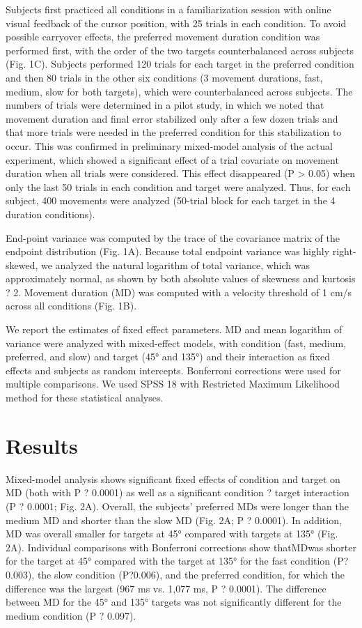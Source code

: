 Subjects first practiced all conditions in a familiarization session with online visual feedback of the cursor position, with 25 trials in each condition. 
To avoid possible carryover effects, the preferred movement duration condition was performed first, with the order of the two targets counterbalanced across subjects (Fig. 1C). 
Subjects performed 120 trials for each target in the preferred condition and then 80 trials in the other six conditions (3 movement durations, fast, medium, slow for both targets), which were counterbalanced across subjects. 
The numbers of trials were determined in a pilot study, in which we noted that movement duration and final error stabilized only after a few dozen trials and that more trials were needed in the preferred condition for this stabilization to occur. 
This was confirmed in preliminary mixed-model analysis of the actual experiment, which showed a significant effect of a trial covariate on movement duration when all trials were considered. This effect disappeared (P > 0.05) when only the last 50 trials in each condition and target were analyzed. Thus, for each subject, 400 movements were analyzed (50-trial block for each target in the 4 duration conditions).

End-point variance was computed by the trace of the covariance matrix of the endpoint distribution (Fig. 1A). Because total endpoint variance was highly right-skewed, we analyzed the natural logarithm of total variance, which was approximately normal, as shown by both absolute values of skewness and kurtosis ? 2. Movement duration (MD) was computed with a velocity threshold of 1 cm/s across all conditions (Fig. 1B).

We report the estimates of fixed effect parameters. MD and mean logarithm of variance were analyzed with mixed-effect models, with condition (fast, medium, preferred, and slow) and target (45° and 135°) and their interaction as fixed effects and subjects as random intercepts. Bonferroni corrections were used for multiple comparisons. We used SPSS 18 with Restricted Maximum Likelihood method for these statistical analyses.

\section{Results}

Mixed-model analysis shows significant fixed effects of condition and target on MD (both with P ? 0.0001) as well as a significant condition ? target interaction (P ? 0.0001; Fig. 2A). Overall, the subjects’ preferred MDs were longer than the medium MD and shorter than the slow MD (Fig. 2A; P ? 0.0001). In addition, MD was overall smaller for targets at 45° compared with targets at 135° (Fig. 2A). Individual comparisons with Bonferroni corrections show thatMDwas shorter for the target at 45° compared with the target at 135° for the fast condition (P?0.003), the slow condition (P?0.006), and the preferred condition, for which the difference was the largest (967 ms vs. 1,077 ms, P ? 0.0001). The difference between MD for the 45° and 135° targets was not significantly different for the medium condition (P ? 0.097). 

